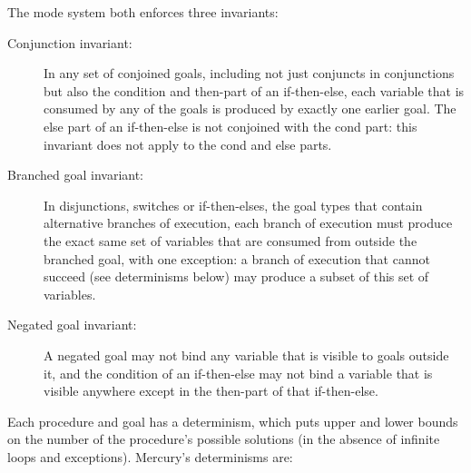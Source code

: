 The mode system both enforces three invariants:

\begin{description}

  \item[Conjunction invariant:]
  In any set of conjoined goals,
  including not just conjuncts in conjunctions
  but also the condition and then-part of an if-then-else,
  each variable that is consumed by any of the goals
  is produced by exactly one earlier goal.
  The else part of an if-then-else is not conjoined with the cond part:
  this invariant does not apply to the cond and else parts.

  \item[Branched goal invariant:]
  In disjunctions, switches or if-then-elses,
  the goal types that contain alternative branches of execution,
  each branch of execution must produce
  the exact same set of variables
  that are consumed from outside the branched goal,
  with one exception:
  a branch of execution that cannot succeed (see determinisms below)
  may produce a subset of this set of variables.
  
  \item[Negated goal invariant:]
  A negated goal may not bind
  any variable that is visible to goals outside it,
  and the condition of an if-then-else may not bind a variable
  that is visible anywhere except in
  the then-part of that if-then-else.

\end{description}

\noindent
Each procedure and goal has a determinism,
which puts upper and lower bounds on the number of the procedure's possible
solutions
(in the absence of infinite loops and exceptions).
Mercury's determinisms are:

